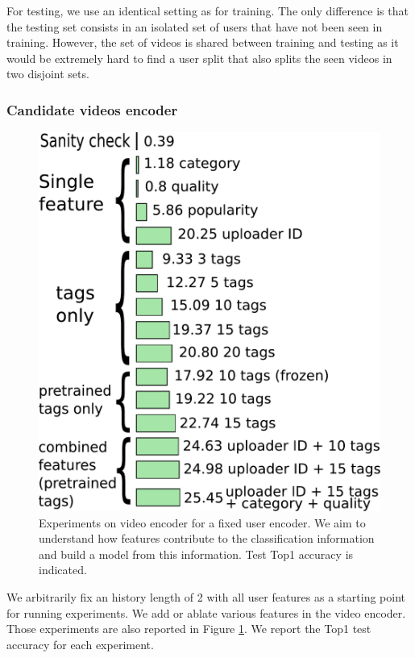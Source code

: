 For testing, we use an identical setting as for training. The only difference is that the testing set consists in an isolated set of users that have not been seen in training. However, the set of videos is shared between training and testing as it would be extremely hard to find a user split that also splits the seen videos in two disjoint sets.

\subsubsection{Candidate videos encoder}

\begin{figure}
    \centering
    \includegraphics[width=0.6\columnwidth]{70-files/video-encoder-tests.pdf}
    \caption{Experiments on video encoder for a fixed user encoder. We aim to understand how features contribute to the classification information and build a model from this information. Test Top1 accuracy is indicated.}
    \label{fig:video-enc-exp}
\end{figure}


We arbitrarily fix an history length of 2 with all user features as a starting point for running experiments. We add or ablate various features in the video encoder. Those experiments are also reported in Figure \ref{fig:video-enc-exp}. We report the Top1 test accuracy for each experiment.

